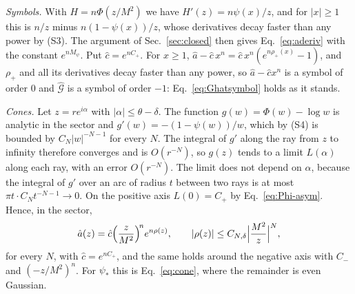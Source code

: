 \documentclass[a4paper,11pt]{article}
\begin{document}
\textit{Symbols.} With $H=n\Phi(z/M^2)$ we have $H'(z)=n\psi(x)/z$, and for $|x|\ge1$ this is $n/z$ minus $n(1-\psi(x))/z$, whose derivatives decay faster than any power by (S3). The argument of Sec.~\ref{sec:closed} then gives Eq.~\eqref{eq:aderiv} with the constant $e^{nM_\psi}$. Put $\hat c=e^{nC_+}$. For $x\ge1$, $\hat a-\hat c\,x^n=\hat c\,x^n(e^{n\rho_+(x)}-1)$, and $\rho_+$ and all its derivatives decay faster than any power, so $\hat a-\hat cx^n$ is a symbol of order $0$ and $\hat{\mathcal G}$ is a symbol of order $-1$: Eq.~\eqref{eq:Ghatsymbol} holds as it stands.

\textit{Cones.} Let $z=re^{i\alpha}$ with $|\alpha|\le\theta-\delta$. The function $g(w)=\Phi(w)-\log w$ is analytic in the sector and $g'(w)=-(1-\psi(w))/w$, which by (S4) is bounded by $C_N|w|^{-N-1}$ for every $N$. The integral of $g'$ along the ray from $z$ to infinity therefore converges and is $O(r^{-N})$, so $g(z)$ tends to a limit $L(\alpha)$ along each ray, with an error $O(r^{-N})$. The limit does not depend on $\alpha$, because the integral of $g'$ over an arc of radius $t$ between two rays is at most $\pi t\cdot C_Nt^{-N-1}\to0$. On the positive axis $L(0)=C_+$ by Eq.~\eqref{eq:Phi-asym}. Hence, in the sector,
\begin{equation}
\label{eq:cone-gen}
\hat a(z)=\hat c\Bigl(\frac z{M^2}\Bigr)^{\!n}e^{n\rho(z)},\qquad|\rho(z)|\le C_{N,\delta}\Bigl|\frac{M^2}z\Bigr|^N ,
\end{equation}
for every $N$, with $\hat c=e^{nC_+}$, and the same holds around the negative axis with $C_-$ and $(-z/M^2)^n$. For $\psi_*$ this is Eq.~\eqref{eq:cone}, where the remainder is even Gaussian.
\end{document}
